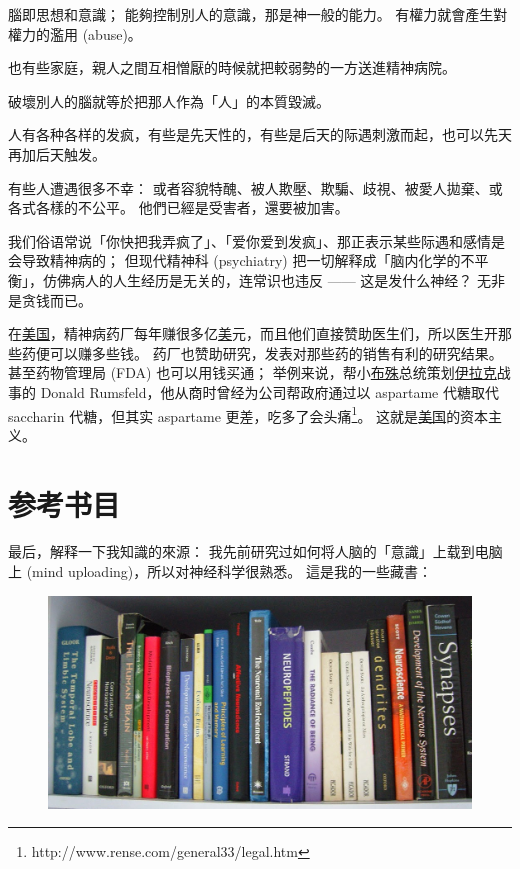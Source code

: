 \documentclass[12pt]{report}
\begin{document}
{腦即思想和意識； 能夠控制別人的意識，那是神一般的能力。 有權力就會產生對權力的濫用 (abuse)。

也有些家庭，親人之間互相憎厭的時候就把較弱勢的一方送進精神病院。

破壞別人的腦就等於把那人作為「人」的本質毀滅。

人有各种各样的发疯，有些是先天性的，有些是后天的际遇刺激而起，也可以先天再加后天触发。

有些人遭遇很多不幸： 或者容貌特醜、被人欺壓、欺騙、歧視、被愛人拋棄、或各式各樣的不公平。 他們已經是受害者，還要被加害。

我们俗语常说「你快把我弄疯了」、「爱你爱到发疯」、那正表示某些际遇和感情是会导致精神病的； 但现代精神科 (psychiatry) 把一切解释成「脑内化学的不平衡」，仿佛病人的人生经历是无关的，连常识也违反 —— 这是发什么神经？ 无非是贪钱而已。

在\uline{美国}，精神病药厂每年赚很多亿\uline{美}元，而且他们直接赞助医生们，所以医生开那些药便可以赚多些钱。 药厂也赞助研究，发表对那些药的销售有利的研究结果。 甚至药物管理局 (FDA) 也可以用钱买通； 举例来说，帮小\uline{布殊}总统策划\uline{伊拉克}战事的 Donald Rumsfeld，他从商时曾经为公司帮政府通过以 aspartame 代糖取代 saccharin 代糖，但其实 aspartame 更差，吃多了会头痛\footnote{http://www.rense.com/general33/legal.htm}。 这就是\uline{美国}的资本主义。

\section{参考书目}

最后，解释一下我知識的來源： 我先前研究过如何将人脑的「意識」上载到电脑上 (mind uploading)，所以对神经科学很熟悉。 這是我的一些藏書：

\begin{figure}[H]
\centering
\includegraphics[scale=0.5]{neuro-books1.jpg}
\end{figure}

}
\end{document}
